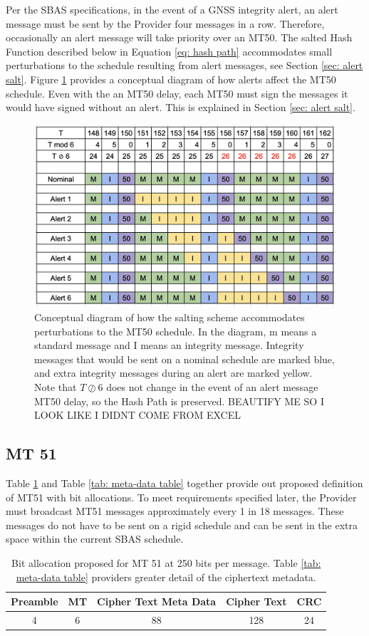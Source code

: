 \documentclass[letterpaper,times]{IONconf/IONconf}
\begin{document}
Per the SBAS specifications, in the event of a GNSS integrity alert, an alert message must be sent by the Provider four messages in a row.
Therefore,  occasionally an alert message will take priority over an MT50.
The salted Hash Function described below in Equation \eqref{eq: hash path} accommodates small perturbations to the schedule resulting from alert messages, see Section \ref{sec: alert salt}.
Figure \ref{fig: alert schedule} provides a conceptual diagram of how alerts affect the MT50 schedule.
Even with the an MT50 delay, each MT50 must sign the messages it would have signed without an alert.
This is explained in Section \ref{sec: alert salt}.

\begin{figure}
\centering
\includegraphics[width=0.5\linewidth]{fig/alertschedule.png}
\caption{Conceptual diagram of how the salting scheme accommodates perturbations to the MT50 schedule. In the diagram, m means a standard message and I means an integrity message. Integrity messages that would be sent on a nominal schedule are marked blue, and extra integrity messages during an alert are marked yellow. Note that $T \oslash 6$ does not change in the event of an alert message MT50 delay, so the Hash Path is preserved. BEAUTIFY ME SO I LOOK LIKE I DIDNT COME FROM EXCEL}
\label{fig: alert schedule}
\end{figure}

\subsection{MT 51}
Table \ref{tab: high-level table} and Table \ref{tab: meta-data table} together provide out proposed definition of MT51 with bit allocations.
To meet requirements specified later, the Provider must broadcast MT51 messages approximately every 1 in 18 messages.
These messages do not have to be sent on a rigid schedule and can be sent in the extra space within the current SBAS schedule.

\begin{table}[H]
\center
\begin{tabular}{|c|c|c|c|c|} \hline
	Preamble & MT & Cipher Text Meta Data & Cipher Text & CRC \\ \hline
	4 & 6 & 88 & 128 & 24 \\ \hline
\end{tabular}
\caption{Bit allocation proposed for MT 51 at 250 bits per message. Table \ref{tab: meta-data table} providers greater detail of the ciphertext metadata.}
\label{tab: high-level table}
\end{table}
\end{document}
